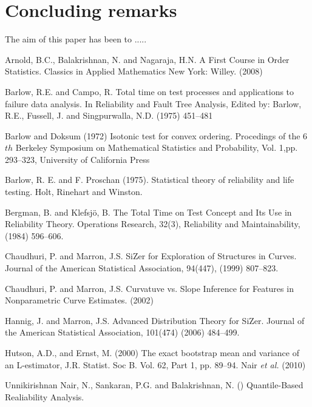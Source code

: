 \documentclass[preprint,12pt]{elsarticle}
\begin{document}
\section{Concluding remarks}

The aim of this paper has been to .....
\newpage
\begin{thebibliography}{}

 Arnold, B.C., Balakrishnan, N. and Nagaraja, H.N. A First Course in Order Statistics. Classics in Applied Mathematics New York: Willey. (2008)

 Barlow, R.E. and Campo, R. Total time on test processes and applications to failure data analysis. In Reliability and Fault Tree Analysis, Edited by: Barlow, R.E., Fussell, J. and Singpurwalla, N.D. (1975) 451–481

 Barlow and Doksum (1972) Isotonic test for convex ordering. Procedings of the 6$th$ Berkeley Symposium on Mathematical Statistics and Probability, Vol. 1,pp. 293--323, University of California Press

 Barlow, R. E. and F. Proschan (1975). Statistical theory of reliability and life testing. Holt,
Rinehart and Winston.

 Bergman, B. and Klefsjö, B. The Total Time on Test Concept and Its Use in Reliability Theory. Operations Research, 32(3), Reliability and Maintainability, (1984) 596--606.

 Chaudhuri, P. and Marron, J.S. SiZer for Exploration of Structures in Curves. Journal of the American Statistical Association, 94(447), (1999)  807--823.

 Chaudhuri, P. and Marron, J.S. Curvatuve vs. Slope Inference for Features in Nonparametric Curve Estimates. (2002) 

 Hannig, J. and Marron, J.S. Advanced Distribution Theory for SiZer. Journal of the American Statistical Association, 101(474) (2006) 484--499.

 Hutson, A.D., and Ernst, M. (2000) The exact bootstrap mean and variance of an L-estimator, J.R. Statist. Soc B. Vol. 62, Part 1, pp. 89--94.
 Nair {\it et al.} (2010)

 Unnikirishnan Nair, N., Sankaran, P.G. and Balakrishnan, N. () Quantile-Based Realiability Analysis. 

\end{thebibliography}
\end{document}
